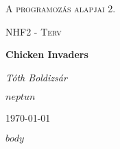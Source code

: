 \documentclass{article}
\begin{document}
\begin{titlepage}
    \centering
    {\scshape\LARGE A programozás alapjai 2. \par}
    {\scshape\Large NHF2 - Terv \par}
    \vspace{1.5cm}
    {\huge\bfseries Chicken Invaders \par}
    \vspace{2cm}
    {\Large\itshape Tóth Boldizsár \par}
	{\Large\itshape $neptun$ \par}
    \vfill
    {\large {}\today\par}
\end{titlepage}

$body$
\end{document}
